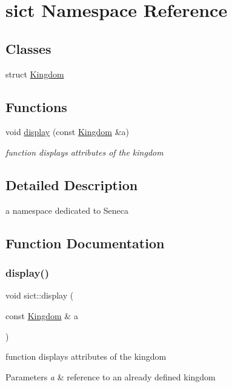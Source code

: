 \hypertarget{namespacesict}{}\section{sict Namespace Reference}
\label{namespacesict}
\subsection*{Classes}
\begin{DoxyCompactItemize}
\item 
struct \mbox{\hyperlink{structsict_1_1_kingdom}{Kingdom}}
\end{DoxyCompactItemize}
\subsection*{Functions}
\begin{DoxyCompactItemize}
\item 
void \mbox{\hyperlink{namespacesict_a92bb87ab4231adf62a692806634e9159}{display}} (const \mbox{\hyperlink{structsict_1_1_kingdom}{Kingdom}} \&a)
\begin{DoxyCompactList}\small\item\em function displays attributes of the kingdom \end{DoxyCompactList}\end{DoxyCompactItemize}


\subsection{Detailed Description}
a namespace dedicated to Seneca 

\subsection{Function Documentation}
\mbox{\label{namespacesict_a92bb87ab4231adf62a692806634e9159}} 
\subsubsection{\texorpdfstring{display()}{display()}}
{\footnotesize\ttfamily void sict\+::display (\begin{DoxyParamCaption}\item[{const \mbox{\hyperlink{structsict_1_1_kingdom}{Kingdom}} \&}]{a }\end{DoxyParamCaption})}



function displays attributes of the kingdom 


\begin{DoxyParams}{Parameters}
{\em a} & reference to an already defined kingdom \\
\hline
\end{DoxyParams}
